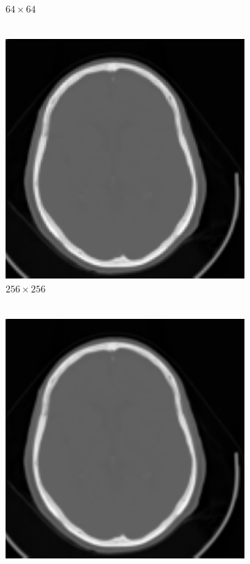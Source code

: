 \documentclass[letterpaper,12pt]{article}
\theoremstyle{plain}
\begin{document}
\begin{figure}[h]
\begin{subfigure}[h]{0.24\linewidth}
            \caption{$64\times64$ \\
            $~$} 
         \end{subfigure}
         \begin{subfigure}[h]{0.24\linewidth}
            \centering
            \includegraphics[width=\textwidth]{Figuras/Interpolate_bilinear_f=2.png}
            \caption{$256\times256$ \\
            $~$} 
         \end{subfigure}
         \begin{subfigure}[h]{0.24\linewidth}
            \centering
            \includegraphics[width=\textwidth]{Figuras/Interpolate_bilinear_f=8.png}

\end{subfigure}
\end{figure}
\end{document}

